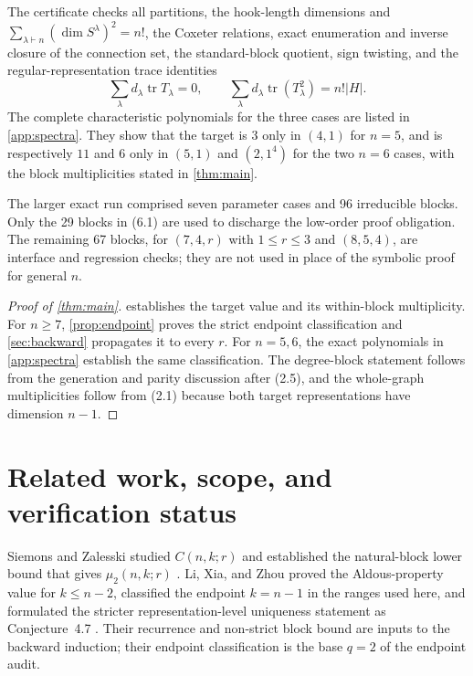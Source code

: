 \documentclass[11pt]{article}
\theoremstyle{definition}
\begin{document}
The certificate checks all partitions, the hook-length dimensions and
$\sum_{\lambda\vdash n}(\dim S^\lambda)^2=n!$, the Coxeter relations, exact
enumeration and inverse closure of the connection set, the standard-block
quotient, sign twisting, and the regular-representation trace identities
\[
 \sum_\lambda d_\lambda\operatorname{tr}T_\lambda=0,
 \qquad
 \sum_\lambda d_\lambda\operatorname{tr}(T_\lambda^2)=n!|H|.
 \tag{6.3}
\]
The complete characteristic polynomials for the three cases are listed in
\cref{app:spectra}.  They show that the target is $3$ only in $(4,1)$ for
$n=5$, and is respectively $11$ and $6$ only in $(5,1)$ and
$(2,1^4)$ for the two $n=6$ cases, with the block multiplicities stated in
\cref{thm:main}.

The larger exact run comprised seven parameter cases and 96 irreducible
blocks.  Only the 29 blocks in (6.1) are used to discharge the low-order
proof obligation.  The remaining 67 blocks, for $(7,4,r)$ with
$1\leq r\leq3$ and $(8,5,4)$, are interface and regression checks; they are
not used in place of the symbolic proof for general $n$.

\begin{proof}[Proof of \cref{thm:main}]
 establishes the target value and its within-block
multiplicity.  For $n\geq7$, \cref{prop:endpoint} proves the strict endpoint
classification and \cref{sec:backward} propagates it to every $r$.
For $n=5,6$, the exact polynomials in \cref{app:spectra} establish the same
classification.  The degree-block statement follows from the generation
and parity discussion after (2.5), and the whole-graph multiplicities follow
from (2.1) because both target representations have dimension $n-1$.
\end{proof}

\section{Related work, scope, and verification status}

Siemons and Zalesski studied $C(n,k;r)$ and established the natural-block
lower bound that gives $\mu_2(n,k;r)$
\cite{SiemonsZalesski2022}.  Li, Xia, and Zhou proved the Aldous-property
value for $k\leq n-2$, classified the endpoint $k=n-1$ in the ranges used
here, and formulated the stricter representation-level uniqueness statement
as Conjecture~4.7 \cite{LiXiaZhou2026}.  Their recurrence and non-strict
block bound are inputs to the backward induction; their endpoint
classification is the base $q=2$ of the endpoint audit.
\end{document}

